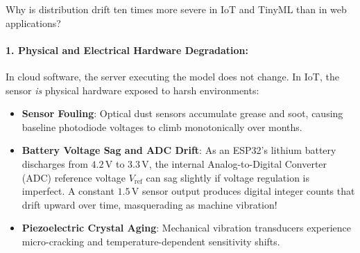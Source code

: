 \begin{iotbox}
Why is distribution drift ten times more severe in IoT and TinyML than in web applications?

\paragraph{1. Physical and Electrical Hardware Degradation:}
In cloud software, the server executing the model does not change. In IoT, the sensor \emph{is} physical hardware exposed to harsh environments:
\begin{itemize}
    \item \textbf{Sensor Fouling}: Optical dust sensors accumulate grease and soot, causing baseline photodiode voltages to climb monotonically over months.
    \item \textbf{Battery Voltage Sag and ADC Drift}: As an ESP32's lithium battery discharges from $4.2\,\text{V}$ to $3.3\,\text{V}$, the internal Analog-to-Digital Converter (ADC) reference voltage $V_{\text{ref}}$ can sag slightly if voltage regulation is imperfect. A constant $1.5\,\text{V}$ sensor output produces digital integer counts that drift upward over time, masquerading as machine vibration!
    \item \textbf{Piezoelectric Crystal Aging}: Mechanical vibration transducers experience micro-cracking and temperature-dependent sensitivity shifts.
\end{itemize}


\end{iotbox}

